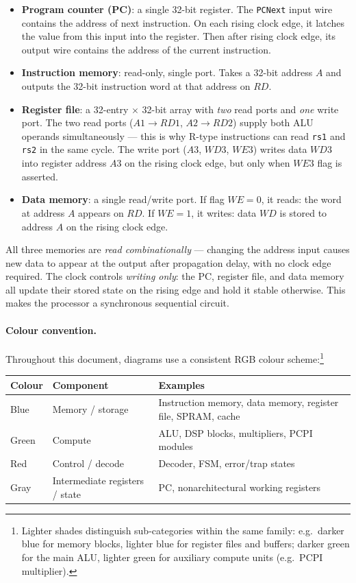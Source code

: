 \documentclass[9pt, a4paper]{extarticle}
\begin{document}
\begin{itemize}
    \item \textbf{Program counter (PC)}: a single 32-bit register. The \texttt{PCNext} input wire contains the address of next instruction. On each rising clock edge, it latches the value from this input into the register. Then after rising clock edge, its output wire contains the address of the current instruction.
    \item \textbf{Instruction memory}: read-only, single port. Takes a 32-bit address $A$ and outputs the 32-bit instruction word at that address on $RD$.
    \item \textbf{Register file}: a 32-entry $\times$ 32-bit array with \emph{two} read ports and \emph{one} write port. The two read ports ($A1 \to RD1$, $A2 \to RD2$) supply both ALU operands simultaneously --- this is why R-type instructions can read \texttt{rs1} and \texttt{rs2} in the same cycle. The write port ($A3$, $WD3$, $WE3$) writes data $WD3$ into register address $A3$ on the rising clock edge, but only when $WE3$ flag is asserted.
    \item \textbf{Data memory}: a single read/write port. If flag $WE = 0$, it reads: the word at address $A$ appears on $RD$. If $WE = 1$, it writes: data $WD$ is stored to address $A$ on the rising clock edge.
\end{itemize}

All three memories are \textit{read combinationally} --- changing the address input causes new data to appear at the output after propagation delay, with no clock edge required. The clock controls \textit{writing only}: the PC, register file, and data memory all update their stored state on the rising edge and hold it stable otherwise. This makes the processor a synchronous sequential circuit.

\paragraph{Colour convention.} Throughout this document, diagrams use a consistent RGB colour scheme:\footnote{Lighter shades distinguish sub-categories within the same family: e.g.\ darker blue for memory blocks, lighter blue for register files and buffers; darker green for the main ALU, lighter green for auxiliary compute units (e.g.\ PCPI multiplier).}

\begin{center}\small
\begin{tabular}{@{}l l l@{}}
    \toprule
    Colour & Component & Examples \\
    \midrule
    \textcolor{blue!70}{Blue} & Memory / storage & Instruction memory, data memory, register file, SPRAM, cache \\
    \textcolor{green!50!black}{Green} & Compute & ALU, DSP blocks, multipliers, PCPI modules \\
    \textcolor{red!60}{Red} & Control / decode & Decoder, FSM, error/trap states \\
    Gray & Intermediate registers / state & PC, nonarchitectural working registers \\
    \bottomrule
\end{tabular}
\end{center}
\end{document}
